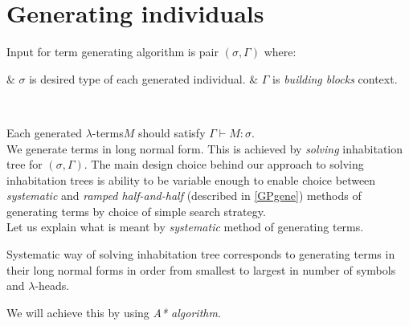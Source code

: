 \documentclass[12pt,a4paper]{report}
\newcommand{\Lets}{Let us\xspace}
\newcommand{\lterms}{$\lambda$-terms\xspace}
\newcommand{\lheads}{$\lambda$-heads\xspace}
\newcommand{\turst}[3]{$#1\vdash{}#2:#3$\xspace}
\newcommand{\GMS}{\turst{\Gamma}{M}{\sigma}}
\newenvironment{enum}
{\begin{easylist}[itemize]}
{\end{easylist}}
\newenvironment{todo}
{ ~\\[0.5em]
  {\color{red}\textbf{TODO}}
  \begin{easylist}[itemize]}
{ \end{easylist}
  ~}
\begin{document}

\section{Generating individuals}



Input for term generating algorithm is pair $(\sigma,\Gamma)$ where:\\

\begin{enum}
 & $\sigma$ is desired type of each generated individual.
 & $\Gamma$ is \textit{building blocks} context. 
\end{enum}~
 
Each generated \lterms $M$ should  satisfy \GMS. \\

We generate terms in long normal form.
This is achieved by \textit{solving} inhabitation tree for $(\sigma,\Gamma)$.  
The main design choice behind our approach to solving inhabitation trees
is ability to be variable enough to enable choice between 
\textit{systematic}  
and \textit{ramped half-and-half} (described in \ref{GPgene}) 
methods of generating terms 
by choice of simple search strategy.\\

\Lets explain what is meant by \textit{systematic} 
method of generating terms. 

Systematic way of solving inhabitation tree corresponds to
generating terms in their long normal forms
in order from smallest to largest in number of symbols and \lheads.

We will achieve this by using \textit{A* algorithm}. 

\end{document}
